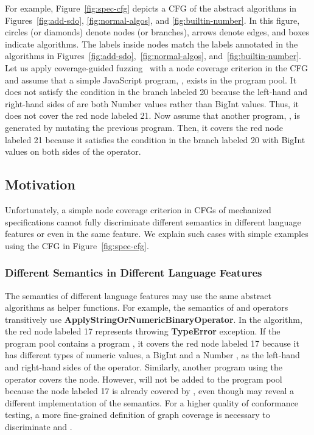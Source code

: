 For example, Figure~\ref{fig:spec-cfg} depicts a CFG of the abstract algorithms
in Figures~\ref{fig:add-sdo}, \ref{fig:normal-algos}, and
\ref{fig:builtin-number}.
In this figure, circles (or diamonds) denote nodes (or branches), arrows denote
edges, and boxes indicate algorithms.
The labels inside nodes match the labels annotated in the algorithms in
Figures~\ref{fig:add-sdo},~\ref{fig:normal-algos}, and~\ref{fig:builtin-number}.
Let us apply coverage-guided fuzzing~\cite{afl} with a node coverage
criterion in the CFG and assume that a simple JavaScript program, ,
exists in the program pool.
It does not satisfy the condition in the branch labeled 20 because the left-hand and
right-hand sides of  are both Number values rather than BigInt values.
Thus, it does not cover the red node labeled 21.
Now assume that another program, , is generated by mutating
the previous program.
Then, it covers the red node labeled 21 because it satisfies the condition
in the branch labeled 20 with BigInt values on both sides of the \jscode{+} operator.


\subsection{Motivation}\label{sec:motiv}

Unfortunately, a simple node coverage criterion in CFGs of mechanized
specifications cannot fully discriminate different semantics in different
language features or even in the same feature.
We explain such cases with simple examples using the CFG in Figure~\ref{fig:spec-cfg}.


\subsubsection{Different Semantics in Different Language
Features}\label{sec:diff-feat}

The semantics of different language features may use the same abstract
algorithms as helper functions.
For example, the semantics of \scode{+} and \scode{-}
operators transitively use \textbf{ApplyStringOrNumericBinaryOperator}.
In the algorithm, the red node labeled 17 represents throwing
\textbf{TypeError} exception.
If the program pool contains a program , it covers the red node
labeled 17 because it has different types of numeric values, a BigInt
 and a Number , as the left-hand and right-hand sides of the
\scode{+} operator.
Similarly, another program  using the \scode{-} operator
covers the node.
However,  will not be added to the program pool because
the node labeled 17 is already covered by ,
even though  may reveal a different implementation of the semantics.
For a higher quality of conformance testing,
a more fine-grained definition of graph coverage is necessary
to discriminate  and .

